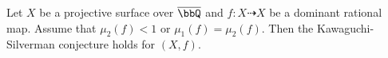   \begin{mainthm}[{= \Yang{}, ref. \cite[Theorem 1.14]{Xie24recursive_inequalities}}]\label{mainthm:application_to_KSC}
    Let $X$ be a projective surface over $\overline{\bbQ}$ and $f: X \dashrightarrow X$ be a dominant rational map.
    Assume that $\mu_2(f) < 1$ or $\mu_1(f) = \mu_2(f)$.
    Then the Kawaguchi-Silverman conjecture holds for $(X, f)$.
  \end{mainthm}